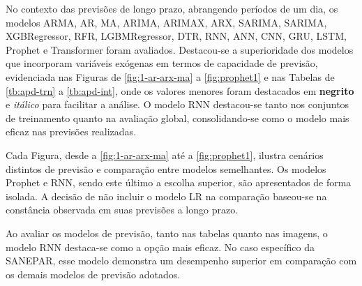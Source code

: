 No contexto das previsões de longo prazo, abrangendo períodos de um dia, os modelos ARMA, AR, MA, ARIMA, ARIMAX, ARX, SARIMA, SARIMA, XGBRegressor, RFR, LGBMRegressor, DTR, RNN, ANN, CNN, GRU, LSTM, Prophet e Transformer foram avaliados. Destacou-se a superioridade dos modelos que incorporam variáveis exógenas em termos de capacidade de previsão, evidenciada nas Figuras de \ref{fig:1-ar-arx-ma} a \ref{fig:prophet1} e nas Tabelas de \ref{tb:apd-trn} a \ref{tb:apd-int}, onde os valores menores foram destacados em \textbf{negrito} e \textit{itálico} para facilitar a análise. O modelo RNN destacou-se tanto nos conjuntos de treinamento quanto na avaliação global, consolidando-se como o modelo mais eficaz nas previsões realizadas.

Cada Figura, desde a \ref{fig:1-ar-arx-ma} até a \ref{fig:prophet1}, ilustra cenários distintos de previsão e comparação entre modelos semelhantes. Os modelos Prophet e RNN, sendo este último a escolha superior, são apresentados de forma isolada. A decisão de não incluir o modelo LR na comparação baseou-se na constância observada em suas previsões a longo prazo.

Ao avaliar os modelos de previsão, tanto nas tabelas quanto nas imagens, o modelo RNN destaca-se como a opção mais eficaz. No caso específico da SANEPAR, esse modelo demonstra um desempenho superior em comparação com os demais modelos de previsão adotados.


